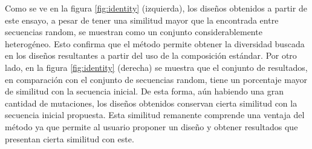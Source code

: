 \vspace{0.3cm}

% 
% 
Como se ve en la figura \ref{fig:identity} (izquierda), los diseños obtenidos a partir de este ensayo, a pesar de tener una similitud mayor que la encontrada entre secuencias random, se 
muestran como un conjunto considerablemente heterogéneo. Esto confirma que el método permite obtener la diversidad buscada en los diseños resultantes a partir del uso de la composición estándar.
Por otro lado, en la figura \ref{fig:identity} (derecha) se muestra que el conjunto de resultados, en comparación con el conjunto de secuencias random, tiene un porcentaje mayor de similitud con la secuencia inicial. 
De esta forma, aún habiendo una gran cantidad de mutaciones, los diseños obtenidos conservan cierta similitud con la secuencia inicial propuesta. 
Esta similitud remanente comprende una ventaja del método ya que permite al usuario proponer un diseño y obtener resultados que presentan cierta similitud con este.



